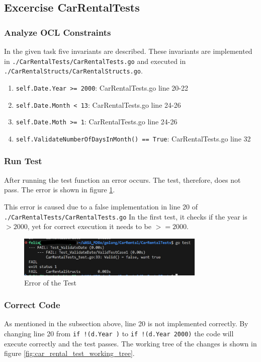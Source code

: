 \subsection{Excercise CarRentalTests}
\label{sec:car_rental_tests}
\subsubsection*{Analyze OCL Constraints}
In the given task five invariants are described.
These invariants are implemented in \texttt{./CarRentalTests/CarRentalTests.go} and executed in \texttt{./CarRentalStructs/CarRentalStructs.go}.
\begin{enumerate}
    \item \texttt{self.Date.Year >= 2000}: CarRentalTests.go line 20-22
    \item \texttt{self.Date.Month < 13}: CarRentalTests.go line 24-26
    \item \texttt{self.Date.Moth >= 1}: CarRentalTests.go line 24-26
    \item \texttt{self.ValidateNumberOfDaysInMonth() == True}: CarRentalTests.go line 32
\end{enumerate}

\subsubsection*{Run Test}
After running the test function an error occurs. 
The test, therefore, does not pass.
The error is shown in figure \ref{fig:car_rental_test_error}.

This error is caused due to a false implementation in line 20 of \texttt{./CarRentalTests/CarRentalTests.go}
In the first test, it checks if the year is $>2000$, yet for correct execution it needs to be $>=2000$.

\begin{figure}[H]
    \centering
    \includegraphics[width=0.8\textwidth]{figures/goLang/carRental/carRental_dateTestError.png}
    \caption{Error of the Test}
    \label{fig:car_rental_test_error}
\end{figure}

\subsubsection*{Correct Code}
As mentioned in the subsection above, line 20 is not implemented correctly.
By changing line 20 from \texttt{if !(d.Year )} to \texttt{if !(d.Year \>\= 2000)} the code will execute correctly and the test passes.
The working tree of the changes is shown in figure \ref{fig:car_rental_test_working_tree}.

